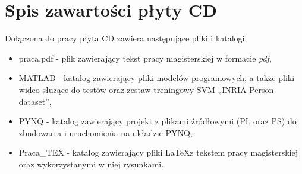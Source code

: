 \renewcommand{\thesection}{\Alph{section}}
\section{Spis zawartości płyty CD}

Dołączona do pracy płyta CD zawiera następujące pliki i katalogi:
\begin{itemize}
	\item praca.pdf - plik zawierający tekst pracy magisterskiej w formacie \textit{pdf},
	\item MATLAB - katalog zawierający pliki modelów programowych, a także pliki wideo służące do testów oraz zestaw treningowy SVM „INRIA Person dataset”,
	\item PYNQ - katalog zawierający projekt z plikami źródłowymi (PL oraz PS) do zbudowania i uruchomienia na układzie PYNQ,
	\item Praca\_TEX - katalog zawierający pliki \LaTeX z tekstem pracy magisterskiej oraz wykorzystanymi w niej rysunkami.
\end{itemize}